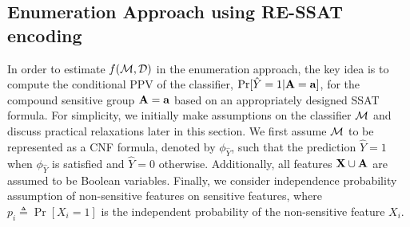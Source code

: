 \subsection{Enumeration Approach  using RE-SSAT encoding}
\label{fairness_justicia_sec:enumeration_ssat}
In order to estimate $ f(\mathcal{M}, \mathcal{D}) $ in the enumeration approach, the key idea  is to compute the conditional PPV of the classifier, $\Pr[\hat{Y} = 1 | \mathbf{A} = \mathbf{a}]$, for the compound sensitive group $\mathbf{A} = \mathbf{a}$ based on an appropriately designed SSAT formula.  For simplicity, we  initially make assumptions on the classifier $ \mathcal{M} $ and discuss practical relaxations later in this section.  We first assume $\mathcal{M}$ to be represented as a CNF formula, denoted by $\phi_{\hat{Y}}$, such that the prediction $ \hat{Y} = 1 $ when $ \phi_{\hat{Y}}$ is satisfied and  $\hat{Y} =0$ otherwise. Additionally, all features $ \mathbf{X} \cup \mathbf{A} $ are assumed to be Boolean variables.  Finally, we consider independence probability assumption of non-sensitive features on sensitive features, where $p_i \triangleq \Pr[X_i = 1] $ is the independent probability of the non-sensitive feature $ X_i $. 


\noindent\makebox[\linewidth]{\rule{\paperwidth}{2.5pt}}

